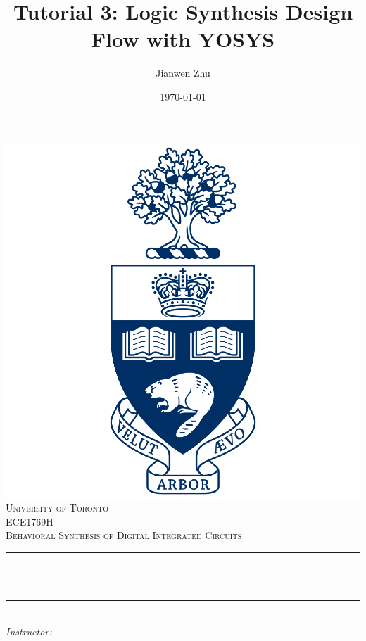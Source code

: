 \documentclass[12pt]{article}
\title{Tutorial 3: Logic Synthesis Design Flow with YOSYS} 			%
\author{Jianwen Zhu}								%
\date{\today}									%
\makeatletter
\newcommand{\course} {ECE1769H}
\let\thetitle\@title
\let\theauthor\@author
\makeatother
\begin{document}

\begin{titlepage}
	\centering
    \vspace*{0.5 cm}
    \includegraphics[scale = 0.12]{UofT.png}\\[1.0 cm]	%
    \textsc{\LARGE University of Toronto}\\[2.0 cm]	%
	\textsc{\Large \course}\\[0.5 cm]				%
	\textsc{\large Behavioral Synthesis of Digital Integrated Circuits}\\[0.5 cm]				%
	\rule{\linewidth}{0.2 mm} \\[0.4 cm]
	{ \huge \bfseries \thetitle}\\
	\rule{\linewidth}{0.2 mm} \\[1.5 cm]
	
		\large
			\emph{Instructor:}\\
			\theauthor 
			
 
	\vfill
	
\end{titlepage}
\end{document}
